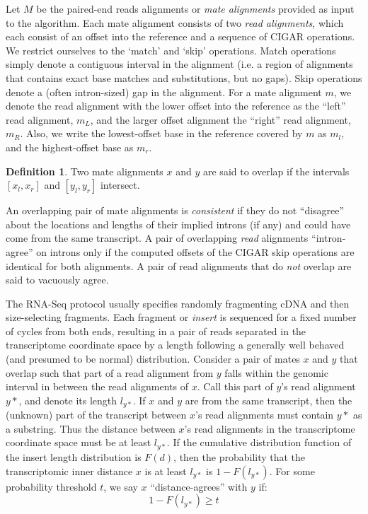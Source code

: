 \documentclass[twocolumn]{homework}
\theoremstyle{definition}
\newtheorem{defn}{Definition}
\begin{document}
Let $M$ be the paired-end reads alignments or \emph{mate alignments} provided as input to the algorithm.  Each mate alignment consists of two \emph{read alignments}, which each consist of an offset into the reference and a sequence of CIGAR operations.  We restrict ourselves to the `match' and `skip' operations.  Match operations simply denote a contiguous interval in the alignment (i.e. a region of alignments that contains exact base matches and substitutions, but no gaps).  Skip operations denote a (often intron-sized) gap in the alignment.  For a mate alignment $m$, we denote the read alignment with the lower offset into the reference as the ``left'' read alignment, $m_L$, and the larger offset alignment the ``right'' read alignment, $m_R$.  Also, we write the lowest-offset base in the reference covered by $m$ as $m_l$, and the highest-offset base as $m_r$.  

\begin{defn}
Two mate alignments $x$ and $y$ are said to overlap if the intervals $[x_l,x_r]$ and $[y_l,y_r]$ intersect.    
\end{defn}

An overlapping pair of mate alignments is \emph{consistent} if they do not 
``disagree'' about the locations and lengths of their implied introns (if any) and could have come from the same transcript. A pair of overlapping \emph{read} alignments ``intron-agree'' on introns only if the computed offsets of the CIGAR skip operations are identical for both alignments. A pair of read alignments that do \emph{not} overlap are said to vacuously agree.  

The RNA-Seq protocol usually specifies randomly fragmenting cDNA and then
size-selecting fragments. Each fragment or \emph{insert} is sequenced for a
fixed number of cycles from both ends, resulting in a pair of reads separated
in the transcriptome coordinate space by a length following a generally well
behaved (and presumed to be normal) distribution. Consider a pair of mates $x$
and $y$ that overlap such that part of a read alignment from $y$ falls within
the genomic interval in between the read alignments of $x$. Call this part of
$y$'s read alignment $y*$, and denote its length $l_{y*}$. If $x$ and $y$ are
from the same transcript, then the (unknown) part of the transcript between
$x$'s read alignments must contain $y*$ as a substring. Thus the distance
between $x$'s read alignments in the transcriptome coordinate space must be at
least $l_{y*}$. If the cumulative distribution function of the insert length
distribution is $F(d)$, then the probability that the transcriptomic inner
distance $x$ is at least $l_{y*}$ is $1 - F(l_{y*})$.  For some probability threshold $t$, we say $x$ ``distance-agrees'' with $y$ if:
\begin{equation*}
    1 - F(l_{y*}) \geq t
\end{equation*}
\end{document}
